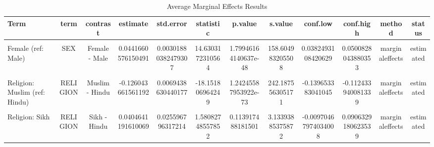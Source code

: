 \begin{table}
\centering
\caption{\label{tbl-ame-results}Average Marginal Effects Results}
\centering
\begin{tabular}[t]{lccccccccccc}
\toprule
Term & term & contrast & estimate & std.error & statistic & p.value & s.value & conf.low & conf.high & method & status\\
\midrule
\cellcolor{gray!10}{Age (years)} & \cellcolor{gray!10}{AGE} & \cellcolor{gray!10}{dY/dX} & \cellcolor{gray!10}{-0.0283376907097982} & \cellcolor{gray!10}{0.000437835030841335} & \cellcolor{gray!10}{-64.7223011263969} & \cellcolor{gray!10}{0} & \cellcolor{gray!10}{Inf} & \cellcolor{gray!10}{-0.0291958316014172} & \cellcolor{gray!10}{-0.0274795498181792} & \cellcolor{gray!10}{marginaleffects} & \cellcolor{gray!10}{estimated}\\
Female (ref: Male) & SEX & Female - Male & 0.0441660576150491 & 0.00301880382479307 & 14.6303172310564 & 1.79946164140637e-48 & 158.604983205508 & 0.0382493108420629 & 0.0500828043880353 & marginaleffects & estimated\\
\cellcolor{gray!10}{Household size} & \cellcolor{gray!10}{HH\_SIZE} & \cellcolor{gray!10}{dY/dX} & \cellcolor{gray!10}{-0.00367954795398623} & \cellcolor{gray!10}{0.000825340494535683} & \cellcolor{gray!10}{-4.45821812736361} & \cellcolor{gray!10}{8.26437807926211e-06} & \cellcolor{gray!10}{16.8846623131125} & \cellcolor{gray!10}{-0.00529718559825865} & \cellcolor{gray!10}{-0.00206191030971381} & \cellcolor{gray!10}{marginaleffects} & \cellcolor{gray!10}{estimated}\\
Religion: Muslim (ref: Hindu) & RELIGION & Muslim - Hindu & -0.126043661561192 & 0.0069438630440177 & -18.151806964249 & 1.24245587953922e-73 & 242.187556305171 & -0.139653383041045 & -0.112433940081339 & marginaleffects & estimated\\
\cellcolor{gray!10}{Religion: Christian} & \cellcolor{gray!10}{RELIGION} & \cellcolor{gray!10}{Christian - Hindu} & \cellcolor{gray!10}{-0.0425996967593138} & \cellcolor{gray!10}{0.0133837887190108} & \cellcolor{gray!10}{-3.18293255024293} & \cellcolor{gray!10}{0.00145791572269921} & \cellcolor{gray!10}{9.42187696003022} & \cellcolor{gray!10}{-0.0688314406252685} & \cellcolor{gray!10}{-0.0163679528933591} & \cellcolor{gray!10}{marginaleffects} & \cellcolor{gray!10}{estimated}\\
Religion: Sikh & RELIGION & Sikh - Hindu & 0.0404641191610069 & 0.025596796317214 & 1.58082748557852 & 0.113917488181501 & 3.13393885375872 & -0.00970467974034008 & 0.0906329180623539 & marginaleffects & estimated\\

\end{tabular}
\end{table}
